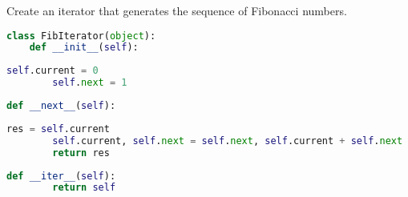 \question Create an iterator that generates the sequence of Fibonacci numbers.
\begin{lstlisting}[language=Python]
class FibIterator(object):
    def __init__(self):
\end{lstlisting}
\begin{solution}[.75in]
    \begin{lstlisting}[language=Python]
        self.current = 0
        self.next = 1
    \end{lstlisting}
\end{solution}
\begin{lstlisting}[language=Python]
    def __next__(self):
\end{lstlisting}
\begin{solution}[1in]
    \begin{lstlisting}[language=Python]
        res = self.current
        self.current, self.next = self.next, self.current + self.next
        return res
    \end{lstlisting}
\end{solution}
\begin{lstlisting}[language=Python]
    def __iter__(self):
        return self
\end{lstlisting}

